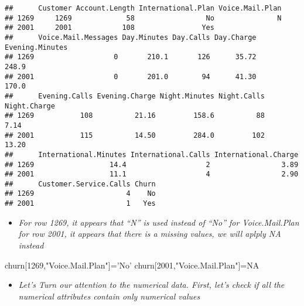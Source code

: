 \documentclass[]{article}
\newenvironment{Shaded}{\begin{snugshade}}{\end{snugshade}}
\newcommand{\DecValTok}[1]{\textcolor[rgb]{0.00,0.00,0.81}{#1}}
\newcommand{\NormalTok}[1]{#1}
\newcommand{\OperatorTok}[1]{\textcolor[rgb]{0.81,0.36,0.00}{\textbf{#1}}}
\newcommand{\OtherTok}[1]{\textcolor[rgb]{0.56,0.35,0.01}{#1}}
\newcommand{\StringTok}[1]{\textcolor[rgb]{0.31,0.60,0.02}{#1}}
\providecommand{\tightlist}{%
  \setlength{\itemsep}{0pt}\setlength{\parskip}{0pt}}
\begin{document}
\begin{Shaded}
\end{Shaded}

\begin{verbatim}
##      Customer Account.Length International.Plan Voice.Mail.Plan
## 1269     1269             58                 No               N
## 2001     2001            108                Yes                
##      Voice.Mail.Messages Day.Minutes Day.Calls Day.Charge Evening.Minutes
## 1269                   0       210.1       126      35.72           248.9
## 2001                   0       201.0        94      41.30           170.0
##      Evening.Calls Evening.Charge Night.Minutes Night.Calls Night.Charge
## 1269           108          21.16         158.6          88         7.14
## 2001           115          14.50         284.0         102        13.20
##      International.Minutes International.Calls International.Charge
## 1269                  14.4                   2                 3.89
## 2001                  11.1                   4                 2.90
##      Customer.Service.Calls Churn
## 1269                      4    No
## 2001                      1   Yes
\end{verbatim}

\begin{itemize}
\tightlist
\item
  \emph{For row 1269, it appears that ``N'' is used instead of ``No''
  for Voice.Mail.Plan for row 2001, it appears that there is a missing
  values, we will aplply NA instead}
\end{itemize}

\begin{Shaded}
\begin{Highlighting}[]
\NormalTok{churn[}\DecValTok{1269}\NormalTok{,}\StringTok{"Voice.Mail.Plan"}\NormalTok{]=}\StringTok{'No'}
\NormalTok{churn[}\DecValTok{2001}\NormalTok{,}\StringTok{"Voice.Mail.Plan"}\NormalTok{]=}\OtherTok{NA}
\end{Highlighting}
\end{Shaded}

\begin{itemize}
\tightlist
\item
  \emph{Let's Turn our attention to the numerical data. First, let's
  check if all the numerical attributes contain only numerical values}
\end{itemize}
\end{document}
